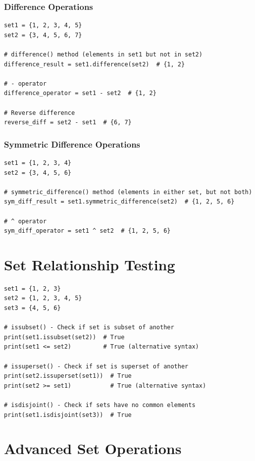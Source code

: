 \documentclass[12pt,a4paper]{article}
\begin{document}
\subsubsection{Difference Operations}

\begin{lstlisting}
set1 = {1, 2, 3, 4, 5}
set2 = {3, 4, 5, 6, 7}

# difference() method (elements in set1 but not in set2)
difference_result = set1.difference(set2)  # {1, 2}

# - operator
difference_operator = set1 - set2  # {1, 2}

# Reverse difference
reverse_diff = set2 - set1  # {6, 7}
\end{lstlisting}

\subsubsection{Symmetric Difference Operations}

\begin{lstlisting}
set1 = {1, 2, 3, 4}
set2 = {3, 4, 5, 6}

# symmetric_difference() method (elements in either set, but not both)
sym_diff_result = set1.symmetric_difference(set2)  # {1, 2, 5, 6}

# ^ operator
sym_diff_operator = set1 ^ set2  # {1, 2, 5, 6}
\end{lstlisting}

\section{Set Relationship Testing}

\begin{lstlisting}
set1 = {1, 2, 3}
set2 = {1, 2, 3, 4, 5}
set3 = {4, 5, 6}

# issubset() - Check if set is subset of another
print(set1.issubset(set2))  # True
print(set1 <= set2)         # True (alternative syntax)

# issuperset() - Check if set is superset of another
print(set2.issuperset(set1))  # True
print(set2 >= set1)           # True (alternative syntax)

# isdisjoint() - Check if sets have no common elements
print(set1.isdisjoint(set3))  # True
\end{lstlisting}

\section{Advanced Set Operations}
\end{document}
